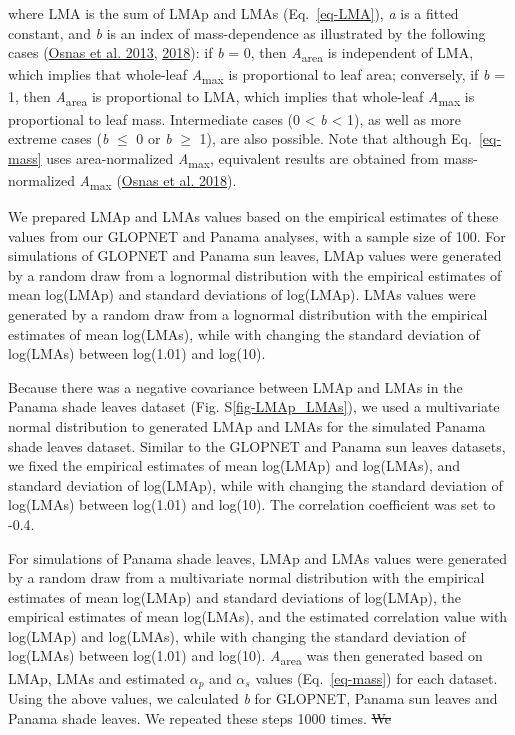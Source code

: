 \documentclass[
  12pt,
  a4paper,
,tablecaptionabove
]{scrartcl}
\providecommand{\DIFdeltex}[1]{{\protect\color{red}\sout{#1}}}                      %
\providecommand{\DIFaddbegin}{} %
\providecommand{\DIFdelbegin}{} %
\providecommand{\DIFdelend}{} %
\providecommand{\DIFdel}[1]{\texorpdfstring{\DIFdeltex{#1}}{}} %
\newcommand{\DIFscaledelfig}{0.5}
\newlength{\DIFdelgraphicswidth} %
\newlength{\DIFdelgraphicsheight} %
\newcommand{\DIFaddincludegraphics}[2][]{{\color{blue}\fbox{\DIFOincludegraphics[#1]{#2}}}} %
\newcommand{\DIFdelincludegraphics}[2][]{%
\sbox{\DIFdelgraphicsbox}{\DIFOincludegraphics[#1]{#2}}%
\settoboxwidth{\DIFdelgraphicswidth}{\DIFdelgraphicsbox} %
\settoboxtotalheight{\DIFdelgraphicsheight}{\DIFdelgraphicsbox} %
\scalebox{\DIFscaledelfig}{%
\parbox[b]{\DIFdelgraphicswidth}{\usebox{\DIFdelgraphicsbox}\\[-\baselineskip] \rule{\DIFdelgraphicswidth}{0em}}\llap{\resizebox{\DIFdelgraphicswidth}{\DIFdelgraphicsheight}{%
\setlength{\unitlength}{\DIFdelgraphicswidth}%
\begin{picture}(1,1)%
\thicklines\linethickness{2pt} %
{\color[rgb]{1,0,0}\put(0,0){\framebox(1,1){}}}%
{\color[rgb]{1,0,0}\put(0,0){\line( 1,1){1}}}%
{\color[rgb]{1,0,0}\put(0,1){\line(1,-1){1}}}%
\end{picture}%
}\hspace*{3pt}}} %
} %
\DeclareRobustCommand{\DIFaddbegin}{\DIFOaddbegin \let\includegraphics\DIFaddincludegraphics} %
\DeclareRobustCommand{\DIFdelbegin}{\DIFOdelbegin \let\includegraphics\DIFdelincludegraphics} %
\DeclareRobustCommand{\DIFdelend}{\DIFOaddend \let\includegraphics\DIFOincludegraphics} %
\begin{document}
where LMA is the sum of LMAp and LMAs (Eq.~\ref{eq-LMA}), \emph{a} is a
fitted constant, and \emph{b} is an index of mass-dependence as
illustrated by the following cases
(\protect\hyperlink{ref-Osnas2013}{Osnas et al. 2013},
\protect\hyperlink{ref-Osnas2018}{2018}): if \emph{b} = 0, then
\emph{A}\textsubscript{area} is independent of LMA, which implies that
whole-leaf \emph{A}\textsubscript{max} is proportional to leaf area;
conversely, if \emph{b} = 1, then \emph{A}\textsubscript{area} is
proportional to LMA, which implies that whole-leaf
\emph{A}\textsubscript{max} is proportional to leaf mass. Intermediate
cases (0 \textless{} \emph{b} \textless{} 1), as well as more extreme
cases (\emph{b} \(\leq\) 0 or \emph{b} \(\geq\) 1), are also possible.
Note that although Eq.~\ref{eq-mass} uses area-normalized
\emph{A}\textsubscript{max}, equivalent results are obtained from
mass-normalized \emph{A}\textsubscript{max}
(\protect\hyperlink{ref-Osnas2018}{Osnas et al. 2018}).

We prepared LMAp and LMAs values based on the empirical estimates of
these values from our GLOPNET and Panama analyses, with a sample size of
100. For simulations of GLOPNET and Panama sun leaves, LMAp values were
generated by a random draw from a lognormal distribution with the
empirical estimates of mean log(LMAp) and standard deviations of
log(LMAp). LMAs values were generated by a random draw from a lognormal
distribution with the empirical estimates of mean log(LMAs), while with
changing the standard deviation of log(LMAs) between log(1.01) and
log(10).

Because there was a negative covariance between LMAp and LMAs in the
Panama shade leaves dataset (Fig. S\ref{fig-LMAp_LMAs}), we used a
multivariate normal distribution to generated LMAp and LMAs for the
simulated Panama shade leaves dataset. Similar to the GLOPNET and Panama
sun leaves datasets, we fixed the empirical estimates of mean log(LMAp)
and log(LMAs), and standard deviation of log(LMAp), while with changing
the standard deviation of log(LMAs) between log(1.01) and log(10). The
correlation coefficient was set to -0.4.

For simulations of Panama shade leaves, LMAp and LMAs values were
generated by a random draw from a multivariate normal distribution with
the empirical estimates of mean log(LMAp) and standard deviations of
log(LMAp), the empirical estimates of mean log(LMAs), and the estimated
correlation value with log(LMAp) and log(LMAs), while with changing the
standard deviation of log(LMAs) between log(1.01) and log(10).
\emph{A}\textsubscript{area} was then generated based on LMAp, LMAs and
estimated \(\alpha_p\) and \(\alpha_s\) values (Eq.~\ref{eq-mass}) for
each dataset. Using the above values, we calculated \emph{b} for
GLOPNET, Panama sun leaves and Panama shade leaves. We repeated these
steps 1000 times.
\DIFdelbegin \DIFdel{We }\DIFdelend \DIFaddbegin 
\end{document}
